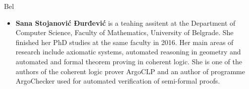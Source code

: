 \begin{sitedescription}{Bel}
\begin{itemize}
  \item{\bf Sana Stojanović Đurđević} is a teahing assitent at the
    Department of Computer Science, Faculty of Mathematics, University
    of Belgrade. She finished her PhD studies at the same faculty in
    2016.  Her main areas of research include axiomatic systems,
    automated reasoning in geometry and automated and formal theorem
    proving in coherent logic. She is one of the authors of the
    coherent logic prover ArgoCLP and an author of programme ArgoChecker
    used for automated verification of semi-formal proofs.
  \end{itemize}
    
  
  
\end{sitedescription}

